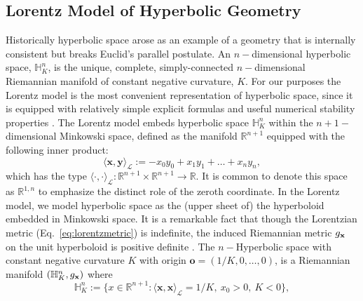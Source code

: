 \subsection{Lorentz Model of Hyperbolic Geometry}
Historically hyperbolic space arose as an example of a geometry that is internally consistent but breaks Euclid's parallel postulate.  An $n-$dimensional hyperbolic space, $\mathbb{H}^n_K$, is the unique, complete, simply-connected $n-$dimensional Riemannian manifold of constant negative curvature, $K$.  For our purposes the Lorentz model is the most convenient representation of hyperbolic space, since it is equipped with relatively simple explicit formulas and useful numerical stability properties \cite{nickel2018learning}. The Lorentz model embeds hyperbolic space $\mathbb{H}^n_K$ within the $n+1-$dimensional Minkowski space, defined as the manifold $\mathbb{R}^{n+1}$ equipped with the following inner product:
\begin{equation}\label{eq:lorentzmetric}
    \langle \textbf{x}, \textbf{y} \rangle_{\mathcal{L}} := -x_0y_0 + x_1y_1 + \dots + x_ny_n,
\end{equation}
which has the type 
$\langle \cdot, \cdot \rangle_{\mathcal{L}}: \mathbb{R}^{n+1} \times \mathbb{R}^{n+1} \to \mathbb{R}$.
It is common to denote this space as $\mathbb{R}^{1,n}$ to emphasize the distinct role of the zeroth coordinate.
In the Lorentz model, we model hyperbolic space as the (upper sheet of) the hyperboloid embedded in Minkowski space. It is a remarkable fact that though the Lorentzian metric (Eq.~\ref{eq:lorentzmetric}) is indefinite,
the induced Riemannian metric $g_{\mathbf{x}}$ on the unit hyperboloid is positive definite \cite{Ratcliffe94}. The $n-$Hyperbolic space with constant negative curvature $K$ with origin $\textbf{o} = (1/K, 0, \dots, 0)$, is a Riemannian manifold $(\mathbb{H}^{n}_K,g_{\mathbf{x}})$ where
\begin{equation*}
    \mathbb{H}^{n}_K := \{x \in \mathbb{R}^{n+1}:  \langle \textbf{x}, \textbf{x} \rangle_{\mathcal{L}} = 1/K, \ x_0 > 0, \ K<0 \},
\end{equation*}


